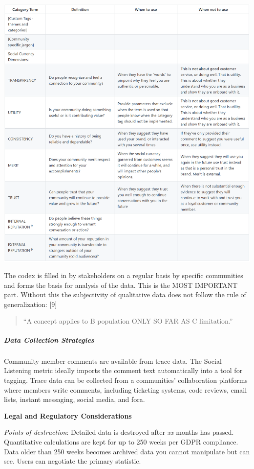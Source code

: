 \includegraphics{images/social-listening_unified-codex-terms-table.png}

The codex is filled in by stakeholders on a regular basis by specific
communities and forms the basis for analysis of the data. This is the
MOST IMPORTANT part. Without this the subjectivity of qualitative data
does not follow the rule of generalization: {[}9{]}

\begin{quote}
``A concept applies to B population ONLY SO FAR AS C limitation.''
\end{quote}

\hypertarget{data-collection-strategies}{%
\subparagraph{Data Collection
Strategies}\label{data-collection-strategies}}

Community member comments are available from trace data. The Social
Listening metric ideally imports the comment text automatically into a
tool for tagging. Trace data can be collected from a communities'
collaboration platforms where members write comments, including
ticketing systems, code reviews, email lists, instant messaging, social
media, and fora.

\textbf{Legal and Regulatory Considerations}

\emph{Points of destruction}: Detailed data is destroyed after \emph{xx}
months has passed. Quantitative calculations are kept for up to 250
weeks per GDPR compliance. Data older than 250 weeks becomes archived
data you cannot manipulate but can see. Users can negotiate the primary
statistic.

